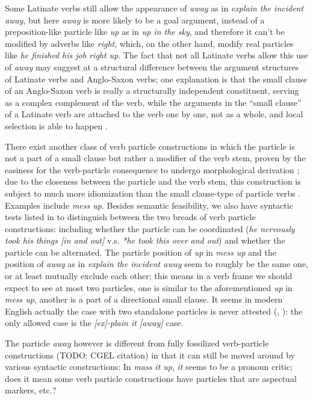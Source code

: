 \documentclass[UTF8, a4paper, oneside, scheme=plain, 12pt]{ctexbook}
\newcommand*{\citepage}[1]{p.~{#1}}
\newcommand{\form}[1]{\emph{#1}}
\begin{document}
Some Latinate verbs still allow the appearance of \form{away} 
as in \form{explain the incident away}, 
but here \form{away} is more likely to be a goal argument, 
instead of a preposition-like particle like \form{up} as in \form{up in the sky}, 
and therefore it can't be modified by adverbs like \form{right},
which, on the other hand, modify real particles like \form{he finished his job right up}.
The fact that not all Latinate verbs allow this use of \form{away} 
may suggest at a structural difference between the argument structures 
of Latinate verbs and Anglo-Saxon verbs;
one explanation is that the small clause of an Anglo-Saxon verb 
is really a structurally independent constituent, 
serving as a complex complement of the verb, 
while the arguments in the ``small clause'' of a Latinate verb 
are attached to the verb one by one, not as a whole, 
and local selection is able to happen \citep{punske2013three}.

There exist another class of verb particle constructions in which 
the particle is not a part of a small clause
but rather a modifier of the verb stem,
proven by the easiness for the verb-particle consequence 
to undergo morphological derivation \citep{farrell2005english};
due to the closeness between the particle and the verb stem, 
this construction is subject to much more idiomization than 
the small clause-type of particle verbs
\citep{wurmbrand2000structure}.
Examples include \form{mess up}.
Besides semantic feasibility, 
we also have syntactic tests listed in \citet{wurmbrand2000structure} to distinguish 
between the two breads of verb particle constructions:
including whether the particle can be coordinated 
(\form{he nervously took his things [in and out]} 
v.s. \form{*he took this over and out})
and whether the particle can be alternated.
The particle position of \form{up} in \form{mess up} 
and the position of \form{away} as in \form{explain the incident away}
seem to roughly be the same one, 
or at least mutually exclude each other; 
this means in a verb frame we should expect to see at most two particles, 
one is similar to the aforementioned \form{up} in \form{mess up},
another is a part of a directional small clause.
It seems in modern English actually the case with two standalone particles 
is never attested (\citealt[\citepage{293}]{dixon2005semantic}, \citealt[\citepage{286}]{cgel}):  
the only allowed case is the \form{[ex]-plain it [away]} case.

The particle \form{away} however is different from fully fossilized verb-particle constructions 
(TODO: CGEL citation) in that it can still be moved around by various syntactic constructions:
In \form{mass it up}, \form{it} seems to be a pronoun critic;
does it mean some verb particle constructions have particles that are aspectual markers, etc.?
\end{document}
